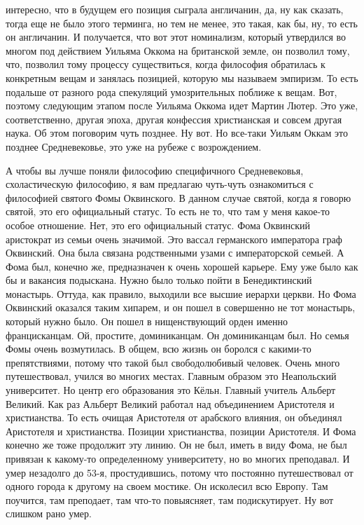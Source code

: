 интересно, что в будущем его позиция сыграла англичанин, да, ну как сказать,
тогда еще не было этого терминга, но тем не менее, это такая, как бы, ну, то
есть он англичанин. И получается, что вот этот номинализм, который утвердился во
многом под действием Уильяма Оккома на британской земле, он позволил тому, что,
позволил тому процессу существиться, когда философия обратилась к конкретным
вещам и занялась позицией, которую мы называем эмпиризм. То есть подальше от
разного рода спекуляций умозрительных поближе к вещам. Вот, поэтому следующим
этапом после Уильяма Оккома идет Мартин Лютер. Это уже, соответственно, другая
эпоха, другая конфессия христианская и совсем другая наука. Об этом поговорим
чуть позднее. Ну вот. Но все-таки Уильям Оккам это позднее Средневековье, это
уже на рубеже с возрождением. 

А чтобы вы лучше поняли философию специфичного
Средневековья, схоластическую философию, я вам предлагаю чуть-чуть ознакомиться
с философией святого Фомы Оквинского. В данном случае святой, когда я говорю
святой, это его официальный статус. То есть не то, что там у меня какое-то
особое отношение. Нет, это его официальный статус. Фома Оквинский аристократ из
семьи очень значимой. Это вассал германского императора граф Оквинский. Она была
связана родственными узами с императорской семьей. А Фома был, конечно же,
предназначен к очень хорошей карьере. Ему уже было как бы и вакансия подыскана.
Нужно было только пойти в Бенедиктинский монастырь. Оттуда, как правило,
выходили все высшие иерархи церкви. Но Фома Оквинский оказался таким хипарем, и
он пошел в совершенно не тот монастырь, который нужно было. Он пошел в
нищенствующий орден именно францисканцам. Ой, простите, доминиканцам. Он
доминиканцам был. Но семья Фомы очень возмутилась. В общем, всю жизнь он боролся
с какими-то препятствиями, потому что такой был свободолюбивый человек. Очень
много путешествовал, учился во многих местах. Главным образом это Неапольский
университет. Но центр его образования это Кёльн. Главный учитель Альберт
Великий. Как раз Альберт Великий работал над объединением Аристотеля и
христианства. То есть очищая Аристотеля от арабского влияния, он объединял
Аристотеля и христианства. Позиции христианства, позиции Аристотеля. И Фома
конечно же тоже продолжит эту линию. Он не был, иметь в виду Фома, не был
привязан к какому-то определенному университету, но во многих преподавал. И умер
незадолго до 53-я, простудившись, потому что постоянно путешествовал от одного
города к другому на своем мостике. Он исколесил всю Европу. Там поучится, там
преподает, там что-то повыясняет, там подискутирует. Ну вот слишком рано умер.
